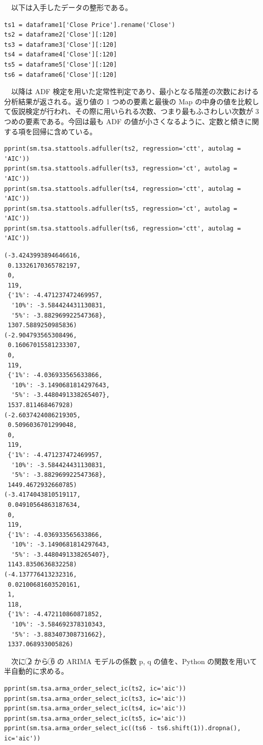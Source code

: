 \documentclass{scrartcl}
\begin{document}
　以下は入手したデータの整形である。\\
\begin{verbatim}
ts1 = dataframe1['Close Price'].rename('Close')
ts2 = dataframe2['Close'][:120]
ts3 = dataframe3['Close'][:120]
ts4 = dataframe4['Close'][:120]
ts5 = dataframe5['Close'][:120]
ts6 = dataframe6['Close'][:120]
\end{verbatim}

　以降は ADF 検定を用いた定常性判定であり、最小となる階差の次数における分析結果が返される。返り値の 1 つめの要素と最後の Map の中身の値を比較して仮説検定が行われ、その際に用いられる次数、つまり最もふさわしい次数が 3 つめの要素である。今回は最も ADF の値が小さくなるように、定数と傾きに関する項を回帰に含めている。\\
\begin{verbatim}
pprint(sm.tsa.stattools.adfuller(ts2, regression='ctt', autolag = 'AIC'))
pprint(sm.tsa.stattools.adfuller(ts3, regression='ct', autolag = 'AIC'))
pprint(sm.tsa.stattools.adfuller(ts4, regression='ctt', autolag = 'AIC'))
pprint(sm.tsa.stattools.adfuller(ts5, regression='ct', autolag = 'AIC'))
pprint(sm.tsa.stattools.adfuller(ts6, regression='ctt', autolag = 'AIC'))
\end{verbatim}

\begin{verbatim}
(-3.4243993894646616,
 0.13326170365782197,
 0,
 119,
 {'1%': -4.471237472469957,
  '10%': -3.584424431130831,
  '5%': -3.882969922547368},
 1307.5889250985836)
(-2.904793565308496,
 0.16067015581233307,
 0,
 119,
 {'1%': -4.036933565633866,
  '10%': -3.1490681814297643,
  '5%': -3.4480491338265407},
 1537.811468467928)
(-2.6037424086219305,
 0.5096036701299048,
 0,
 119,
 {'1%': -4.471237472469957,
  '10%': -3.584424431130831,
  '5%': -3.882969922547368},
 1449.4672932660785)
(-3.4174043810519117,
 0.04910564863187634,
 0,
 119,
 {'1%': -4.036933565633866,
  '10%': -3.1490681814297643,
  '5%': -3.4480491338265407},
 1143.8350636832258)
(-4.137776413232316,
 0.02100681603520161,
 1,
 118,
 {'1%': -4.472110860871852,
  '10%': -3.584692378310343,
  '5%': -3.883407308731662},
 1337.068933005826)
\end{verbatim}

　次に \textcircled{\scriptsize 2} から \textcircled{\scriptsize 6} の ARIMA モデルの係数 p, q の値を、Python の関数を用いて半自動的に求める。\\
\begin{verbatim}
pprint(sm.tsa.arma_order_select_ic(ts2, ic='aic'))
pprint(sm.tsa.arma_order_select_ic(ts3, ic='aic'))
pprint(sm.tsa.arma_order_select_ic(ts4, ic='aic'))
pprint(sm.tsa.arma_order_select_ic(ts5, ic='aic'))
pprint(sm.tsa.arma_order_select_ic((ts6 - ts6.shift(1)).dropna(), ic='aic'))
\end{verbatim}
\end{document}
